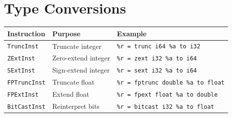 \section{Type Conversions}

\begin{longtable}{|p{3cm}|p{5cm}|p{5cm}|}
\hline
\textbf{Instruction} & \textbf{Purpose} & \textbf{Example} \\
\hline
\texttt{TruncInst} & Truncate integer & \texttt{\%r = trunc i64 \%a to i32} \\
\hline
\texttt{ZExtInst} & Zero-extend integer & \texttt{\%r = zext i32 \%a to i64} \\
\hline
\texttt{SExtInst} & Sign-extend integer & \texttt{\%r = sext i32 \%a to i64} \\
\hline
\texttt{FPTruncInst} & Truncate float & \texttt{\%r = fptrunc double \%a to float} \\
\hline
\texttt{FPExtInst} & Extend float & \texttt{\%r = fpext float \%a to double} \\
\hline
\texttt{BitCastInst} & Reinterpret bits & \texttt{\%r = bitcast i32 \%a to float} \\
\hline
\end{longtable}

